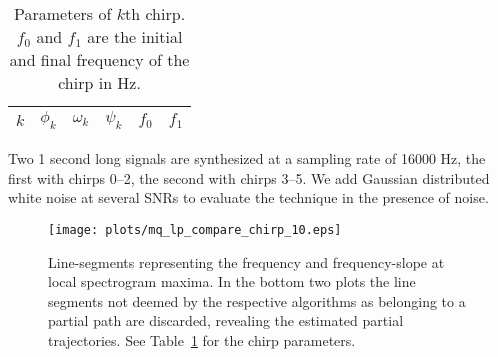 \documentclass{article}
\newcommand{\TmpCapTitle}[0]{default}
\newcommand{\CaptionWithTitle}[2]{
    \renewcommand{\TmpCapTitle}[0]{\protect#1}
    \captionsetup{format=inc-cap-title}
    \caption[\protect#1.]{#2}
}
\def\figwidthscale{0.5}
\begin{document}
\begin{sloppy}
\begin{table}[!b]
    \caption{Parameters of $k$th chirp. $f_{0}$ and $f_{1}$ are the initial and
    final frequency of the chirp in Hz. \label{tab:ptrackexamplechirpparams}}
    \begin{center}
        \begin{tabular}{l c c c c c}
            $k$ & $\phi_{k}$ & $\omega_{k}$ & $\psi_{k}$ & $f_{0}$ & $f_{1}$ \\
            \hline
            
        \end{tabular}
    \end{center}
\end{table}

Two 1 second long signals are synthesized at a sampling rate of 16000 Hz, the
first with chirps 0--2, the second with chirps 3--5. We add
Gaussian distributed white noise at several SNRs to evaluate the technique in the
presence of noise.

\begin{figure}[!t]
    \centering
    \centerline{\texttt{[image: plots/mq\_lp\_compare\_chirp\_10.eps]}}
    \CaptionWithTitle{%
    }{ Line-segments representing the frequency and frequency-slope at local
        spectrogram maxima. In the bottom two plots the line segments not deemed
        by the respective algorithms as belonging to a partial path are
        discarded, revealing the estimated partial trajectories. See
        Table~\ref{tab:ptrackexamplechirpparams} for the chirp parameters.
    \label{plot:mq_lp_compare_chirp_10}}
\end{figure}


\end{sloppy}
\end{document}
